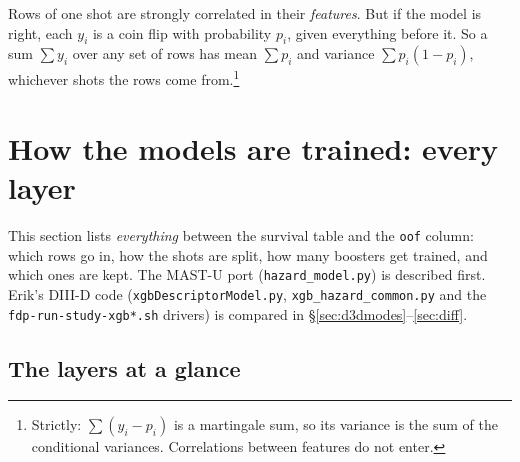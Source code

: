 \documentclass[11pt]{article}
\begin{document}
Rows of one shot are strongly correlated in their \emph{features}. But if the
model is right, each $y_i$ is a coin flip with probability $p_i$, given
everything before it. So a sum $\sum y_i$ over any set of rows has mean
$\sum p_i$ and variance $\sum p_i(1-p_i)$, whichever shots the rows come
from.\footnote{Strictly: $\sum (y_i-p_i)$ is a martingale sum, so its
variance is the sum of the conditional variances. Correlations between
features do not enter.}

\section{How the models are trained: every layer}\label{sec:train}

This section lists \emph{everything} between the survival table and the
\texttt{oof} column: which rows go in, how the shots are split, how many
boosters get trained, and which ones are kept. The MAST-U port
(\texttt{hazard\_model.py}) is described first. Erik's DIII-D code
(\texttt{xgbDescriptorModel.py}, \texttt{xgb\_hazard\_common.py} and the
\texttt{fdp-run-study-xgb*.sh} drivers) is compared in
\S\ref{sec:d3dmodes}--\ref{sec:diff}.

\subsection{The layers at a glance}
\end{document}
